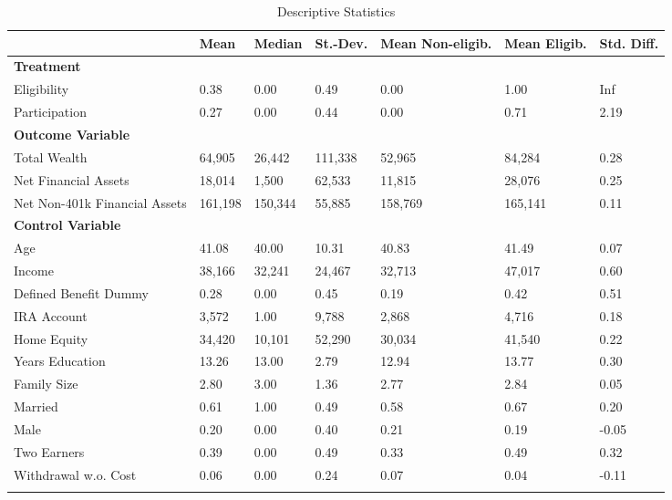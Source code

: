 \documentclass[10pt,a4paper]{article}
\begin{document}
\begin{singlespace}
\begin{ThreePartTable}
				\begin{longtable}{l C{1.45cm} C{1.45cm} C{1.45cm} C{1.45cm}C{1.45cm} C{1.45cm}}
					\caption{Descriptive Statistics}\label{tab_descriptives}\\
					\toprule
					 & Mean & Median & St.-Dev. & Mean Non-eligib. & Mean Eligib. & Std. Diff.\\ 
					\midrule
					\textbf{Treatment} & & & & & & \\
					Eligibility & 0.38 & 0.00 & 0.49 & 0.00 & 1.00 & Inf \\ 
  Participation & 0.27 & 0.00 & 0.44 & 0.00 & 0.71 & 2.19 \\ 
  					\midrule
					\textbf{Outcome Variable} & & & & & & \\
					 Total Wealth & 64,905 & 26,442 & 111,338 & 52,965 & 84,284 & 0.28 \\ 
  Net Financial Assets & 18,014 & 1,500 & 62,533 & 11,815 & 28,076 & 0.25 \\ 
  Net Non-401k Financial Assets & 161,198 & 150,344 & 55,885 & 158,769 & 165,141 & 0.11 \\ 
					\midrule
					\textbf{Control Variable}  & & & & & & \\
				  Age & 41.08 & 40.00 & 10.31 & 40.83 & 41.49 & 0.07 \\ 
Income & 38,166 & 32,241 & 24,467 & 32,713 & 47,017 & 0.60 \\ 
  Defined Benefit Dummy & 0.28 & 0.00 & 0.45 & 0.19 & 0.42 & 0.51 \\ 
  IRA Account& 3,572 & 1.00 & 9,788 & 2,868 & 4,716 & 0.18 \\ 
  Home Equity & 34,420 & 10,101 & 52,290 & 30,034 & 41,540 & 0.22\\
  Years Education & 13.26 & 13.00 & 2.79 & 12.94 & 13.77 & 0.30 \\ 
  Family Size & 2.80 & 3.00 & 1.36 & 2.77 & 2.84 & 0.05 \\ 
  Married & 0.61 & 1.00 & 0.49 & 0.58 & 0.67 & 0.20 \\ 
  Male & 0.20 & 0.00 & 0.40 & 0.21 & 0.19 & -0.05 \\ 
  Two Earners & 0.39 & 0.00 & 0.49 & 0.33 & 0.49 & 0.32 \\ 
   Withdrawal w.o. Cost & 0.06 & 0.00 & 0.24 & 0.07 & 0.04 & -0.11 \\ 

				\bottomrule
				\insertTableNotes \\
				\end{longtable} 

				
			\end{ThreePartTable}
\end{singlespace} 
\end{document}
